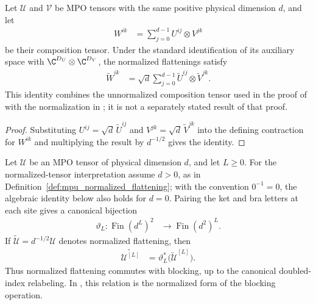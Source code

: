 \begin{lemma}
    \label{lem:mpu_normalized_flattening_composition}
    \leanok
    Let $\mathcal U$ and $\mathcal V$ be MPO tensors with the same positive
    physical dimension $d$, and let
    \begin{align}
        W^{ik} & =\sum_{j=0}^{d-1}U^{ij}\otimes V^{jk}
    \end{align}
    be their composition tensor. Under the standard identification of its
    auxiliary space with $\C^{D_U}\otimes\C^{D_V}$, the normalized
    flattenings satisfy
    \begin{align}
        \widetilde W^{ik}
         & =\sqrt d\sum_{j=0}^{d-1}
        \widetilde U^{ij}\otimes\widetilde V^{jk}.
    \end{align}
    This identity combines the unnormalized composition tensor used in the proof of
    \cite[Theorem~IV.6(ii)]{Cirac2017MPU} with the normalization in
    \cite[Section~III, equation~(13)]{Cirac2017MPU}; it is not a separately
    stated result of that proof.
\end{lemma}

\begin{proof}\leanok
    Substituting $U^{ij}=\sqrt d\,\widetilde U^{ij}$ and
    $V^{jk}=\sqrt d\,\widetilde V^{jk}$ into the defining contraction for
    $W^{ik}$ and multiplying the result by $d^{-1/2}$ gives the identity.
\end{proof}

\begin{lemma}
    \label{thm:mpu_normalized_flattening_blocking}
    \leanok
    Let $\mathcal U$ be an MPO tensor of physical dimension $d$, and let
    $L\geq0$. For the normalized-tensor interpretation assume $d>0$, as in
    Definition~\ref{def:mpu_normalized_flattening}; with the convention
    $0^{-1}=0$, the algebraic identity below also holds for $d=0$. Pairing
    the ket and bra letters at each site gives a canonical bijection
    \begin{align}
        \vartheta_L:\operatorname{Fin}(d^L)^2
         & \longrightarrow \operatorname{Fin}(d^2)^L.
    \end{align}
    If $\widetilde{\mathcal U}=d^{-1/2}\mathcal U$ denotes normalized
    flattening, then
    \begin{align}
        \widetilde{\mathcal U^{[L]}}
         & =\vartheta_L^*\bigl(\widetilde{\mathcal U}^{[L]}\bigr).
        \label{eq:mpu_normalized_flattening_blocking}
    \end{align}
    Thus normalized flattening commutes with blocking, up to the canonical
    doubled-index relabeling. In \cite[Definition~II.5 and equation~(9)]{Cirac2017MPU}, this relation is the normalized form of the blocking
    operation.
\end{lemma}

